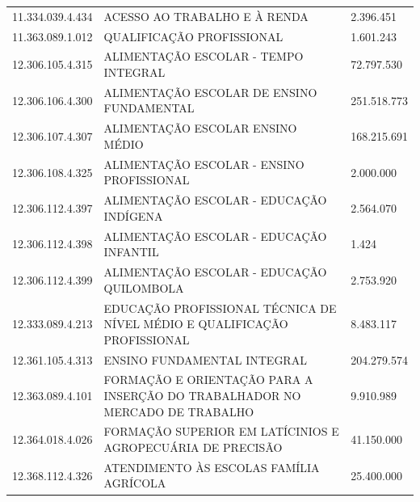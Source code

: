 \documentclass{article}
\begin{document}
\begin{longtable}[c]{m{3cm}|m{12cm}|m{2cm}}
\multicolumn{1}{C{3cm}|}{11.334.039.4.434} & \multicolumn{1}{L{12cm}|}{ACESSO AO TRABALHO E À RENDA} & \multicolumn{1}{R{2cm}}{2.396.451} \\
\multicolumn{1}{C{3cm}|}{11.363.089.1.012} & \multicolumn{1}{L{12cm}|}{QUALIFICAÇÃO PROFISSIONAL} & \multicolumn{1}{R{2cm}}{1.601.243} \\
\multicolumn{1}{C{3cm}|}{12.306.105.4.315} & \multicolumn{1}{L{12cm}|}{ALIMENTAÇÃO ESCOLAR - TEMPO INTEGRAL} & \multicolumn{1}{R{2cm}}{72.797.530} \\
\multicolumn{1}{C{3cm}|}{12.306.106.4.300} & \multicolumn{1}{L{12cm}|}{ALIMENTAÇÃO ESCOLAR DE ENSINO FUNDAMENTAL} & \multicolumn{1}{R{2cm}}{251.518.773} \\
\multicolumn{1}{C{3cm}|}{12.306.107.4.307} & \multicolumn{1}{L{12cm}|}{ALIMENTAÇÃO ESCOLAR ENSINO MÉDIO} & \multicolumn{1}{R{2cm}}{168.215.691} \\
\multicolumn{1}{C{3cm}|}{12.306.108.4.325} & \multicolumn{1}{L{12cm}|}{ALIMENTAÇÃO ESCOLAR - ENSINO PROFISSIONAL} & \multicolumn{1}{R{2cm}}{2.000.000} \\
\multicolumn{1}{C{3cm}|}{12.306.112.4.397} & \multicolumn{1}{L{12cm}|}{ALIMENTAÇÃO ESCOLAR - EDUCAÇÃO INDÍGENA} & \multicolumn{1}{R{2cm}}{2.564.070} \\
\multicolumn{1}{C{3cm}|}{12.306.112.4.398} & \multicolumn{1}{L{12cm}|}{ALIMENTAÇÃO ESCOLAR - EDUCAÇÃO INFANTIL} & \multicolumn{1}{R{2cm}}{1.424} \\
\multicolumn{1}{C{3cm}|}{12.306.112.4.399} & \multicolumn{1}{L{12cm}|}{ALIMENTAÇÃO ESCOLAR - EDUCAÇÃO QUILOMBOLA} & \multicolumn{1}{R{2cm}}{2.753.920} \\
\multicolumn{1}{C{3cm}|}{12.333.089.4.213} & \multicolumn{1}{L{12cm}|}{EDUCAÇÃO PROFISSIONAL TÉCNICA DE NÍVEL MÉDIO E QUALIFICAÇÃO PROFISSIONAL} & \multicolumn{1}{R{2cm}}{8.483.117} \\
\multicolumn{1}{C{3cm}|}{12.361.105.4.313} & \multicolumn{1}{L{12cm}|}{ENSINO FUNDAMENTAL INTEGRAL} & \multicolumn{1}{R{2cm}}{204.279.574} \\
\multicolumn{1}{C{3cm}|}{12.363.089.4.101} & \multicolumn{1}{L{12cm}|}{FORMAÇÃO E ORIENTAÇÃO PARA A INSERÇÃO DO TRABALHADOR NO MERCADO DE TRABALHO} & \multicolumn{1}{R{2cm}}{9.910.989} \\
\multicolumn{1}{C{3cm}|}{12.364.018.4.026} & \multicolumn{1}{L{12cm}|}{FORMAÇÃO SUPERIOR EM LATÍCINIOS E AGROPECUÁRIA DE PRECISÃO} & \multicolumn{1}{R{2cm}}{41.150.000} \\
\multicolumn{1}{C{3cm}|}{12.368.112.4.326} & \multicolumn{1}{L{12cm}|}{ATENDIMENTO ÀS ESCOLAS FAMÍLIA AGRÍCOLA} & \multicolumn{1}{R{2cm}}{25.400.000} \\

\end{longtable}
\end{document}
